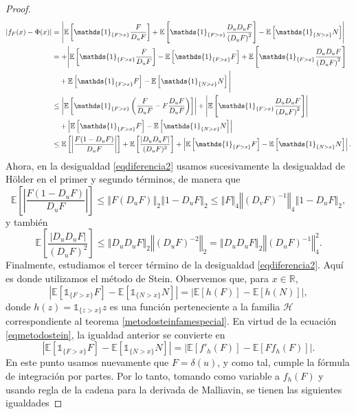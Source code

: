 \documentclass[letterpaper,twoside,12pt]{book}
\newcommand{\R}{\mathbb{R}}
\newcommand{\E}{\mathbb{E}}
\newcommand{\1}{\mathds{1}}
\newcommand{\abs}[1]{\left\lvert #1 \right\rvert}
\newcommand{\norm}[1]{\left\Vert #1 \right\Vert}
\theoremstyle{definition}
\theoremstyle{definition}
\theoremstyle{remark}
\theoremstyle{definition}
\theoremstyle{definition}
\theoremstyle{definition}
\theoremstyle{definition}
\theoremstyle{definition}
\begin{document}
\begin{proof}
\begin{align}\label{eqdiferencia2}
   \abs{f_F(x)-\Phi(x)}&=\abs{\E\left[\1_{\{F>x\}}\frac{F}{D_{u}F}\right]+\E\left[\1_{\{F>x\}}\frac{D_uD_uF}{\left(D_{u}F\right)^2}\right]-\E\left[\1_{\{N>x\}}N\right]}\notag\\
   &=+\Bigg|\E\left[\1_{\{F>x\}}\frac{F}{D_{u}F}\right]-\E\left[\1_{\{F>x\}}F\right]+\E\left[\1_{\{F>x\}}\frac{D_uD_uF}{\left(D_{u}F\right)^2}\right]\notag\\
   &\ \ \ +\E\left[\1_{\{F>x\}}F\right]-\E\left[\1_{\{N>x\}}N\right]\Bigg|\notag\\
   &\leq \abs{\E\left[\1_{\{F>x\}}\left(\frac{F}{D_uF}-F\frac{D_uF}{D_uF}\right)\right]}+\abs{\E\left[\1_{\{F>x\}}\frac{D_uD_uF}{\left(D_{u}F\right)^2}\right]}\notag\\
   &\ \ \ +\abs{\E\left[\1_{\{F>x\}}F\right]-\E\left[\1_{\{N>x\}}N\right]}\notag\\
   &\leq \E\left[\abs{\frac{F(1-D_uF)}{D_uF}}\right]+\E\left[\frac{\abs{D_uD_uF}}{(D_uF)^2}\right]+\abs{\E\left[\1_{\{F>x\}}F\right]-\E\left[\1_{\{N>x\}}N\right]}.
\end{align}
Ahora, en la desigualdad \eqref{eqdiferencia2} usamos sucesivamente la desigualdad de Hölder en el primer y segundo términos, de manera que
\begin{equation}\label{eqdiferencia3}
   \E\left[\abs{\frac{F(1-D_uF)}{D_uF}}\right]\leq \norm{F(D_uF)}_2\norm{1-D_uF}_2\leq \norm{F}_4\norm{(D_vF)^{-1}}_4\norm{1-D_uF}_2,
\end{equation}
y también
\begin{equation}\label{eqdiferencia4}
   \E\left[\frac{\abs{D_uD_uF}}{(D_uF)^2}\right]\leq \norm{D_uD_uF}_2\norm{(D_uF)^{-2}}_2=\norm{D_uD_uF}_2\norm{(D_uF)^{-1}}_4^{2}.
\end{equation}
Finalmente, estudiamos el tercer término de la desigualdad \eqref{eqdiferencia2}. Aquí es donde utilizamos el método de Stein. Observemos que, para $x\in \R$,
\[
   \abs{\E\left[\1_{\{F>x\}}F\right]-\E\left[\1_{\{N>x\}}N\right]}=\abs{\E\left[h(F)\right]-\E\left[h(N)\right]},
\]
donde $h(z)=\1_{\{z>x\}}z$ es una función perteneciente a la familia $\mathscr{H}$ correspondiente al teorema \ref{metodosteinfamespecial}. En virtud de la ecuación \eqref{eqmetodostein}, la igualdad anterior se convierte en
\begin{equation}\label{eqdiferencia5}
   \abs{\E\left[\1_{\{F>x\}}F\right]-\E\left[\1_{\{N>x\}}N\right]}=\abs{\E\left[f'_h(F)\right]-\E\left[Ff_h(F)\right]}.
\end{equation}
En este punto usamos nuevamente que $F=\delta(u)$, y como tal, cumple la fórmula de integración por partes. Por lo tanto, tomando como variable a $f_h(F)$ y usando regla de la cadena para la derivada de Malliavin, se tienen las siguientes igualdades

\end{proof}
\end{document}
